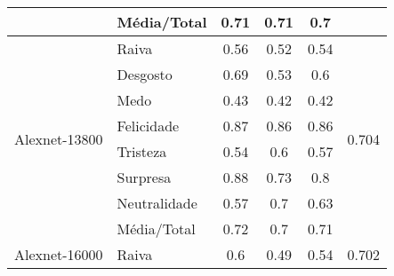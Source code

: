 \begin{table}[]
\begin{tabular}{llcccc}
                                        & Média/Total           & 0.71                                  & 0.71                                   & 0.7                                   &                                       \\ \hline
\multirow{8}{*}{Alexnet-13800}          & Raiva                 & 0.56                                  & 0.52                                   & 0.54                                  & \multirow{8}{*}{0.704}                \\
                                        & Desgosto              & 0.69                                  & 0.53                                   & 0.6                                   &                                       \\
                                        & Medo                  & 0.43                                  & 0.42                                   & 0.42                                  &                                       \\
                                        & Felicidade            & 0.87                                  & 0.86                                   & 0.86                                  &                                       \\
                                        & Tristeza              & 0.54                                  & 0.6                                    & 0.57                                  &                                       \\
                                        & Surpresa              & 0.88                                  & 0.73                                   & 0.8                                   &                                       \\
                                        & Neutralidade          & 0.57                                  & 0.7                                    & 0.63                                  &                                       \\
                                        & Média/Total           & 0.72                                  & 0.7                                    & 0.71                                  &                                       \\ \hline
\multirow{8}{*}{Alexnet-16000}          & Raiva                 & 0.6                                   & 0.49                                   & 0.54                                  & \multirow{8}{*}{0.702}                \\

\end{tabular}
\end{table}
